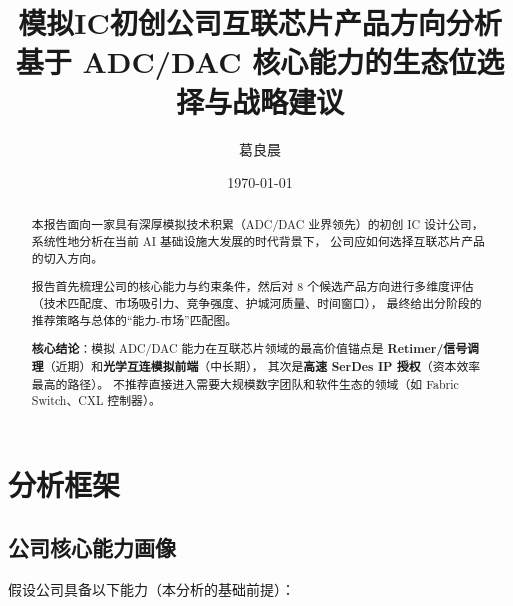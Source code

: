 \documentclass[11pt,a4paper]{ctexart}
\title{\textbf{模拟IC初创公司互联芯片产品方向分析}\\[0.3cm]
       \large 基于 ADC/DAC 核心能力的生态位选择与战略建议}
\author{葛良晨}
\date{\today}
\begin{document}
\maketitle

\begin{abstract}
\noindent
本报告面向一家具有深厚模拟技术积累（ADC/DAC 业界领先）的初创 IC 设计公司，
系统性地分析在当前 AI 基础设施大发展的时代背景下，
公司应如何选择互联芯片产品的切入方向。

报告首先梳理公司的核心能力与约束条件，然后对 8 个候选产品方向进行多维度评估
（技术匹配度、市场吸引力、竞争强度、护城河质量、时间窗口），
最终给出分阶段的推荐策略与总体的``能力-市场''匹配图。

\textbf{核心结论}：模拟 ADC/DAC 能力在互联芯片领域的最高价值锚点是
\textbf{Retimer/信号调理}（近期）和\textbf{光学互连模拟前端}（中长期），
其次是\textbf{高速 SerDes IP 授权}（资本效率最高的路径）。
不推荐直接进入需要大规模数字团队和软件生态的领域（如 Fabric Switch、CXL 控制器）。
\end{abstract}

\tableofcontents
\clearpage

\section{分析框架}

\subsection{公司核心能力画像}

假设公司具备以下能力（本分析的基础前提）：
\end{document}
